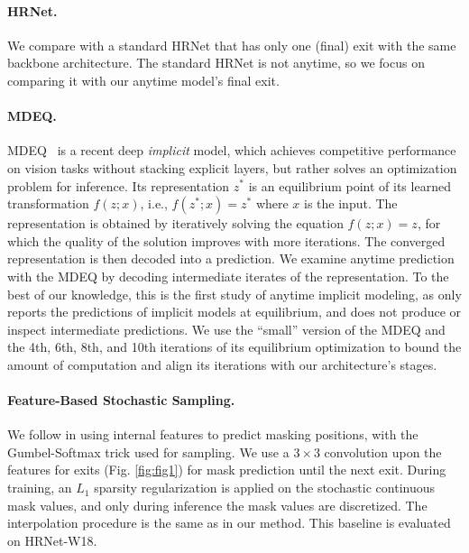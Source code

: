 \paragraph{HRNet.} We compare with a standard HRNet that has only one (final) exit with the same backbone architecture.
The standard HRNet is not anytime, so we focus on comparing it with our anytime model's final exit.

\paragraph{MDEQ.} MDEQ~\cite{bai2020multiscale} is a recent deep \emph{implicit} model, which achieves competitive performance on vision tasks without stacking explicit layers, but rather solves an optimization problem for inference. 
Its representation $z^*$ is an equilibrium point of its learned transformation $f(z; x)$, i.e., $f(z^*; x) = z^*$ where $x$ is the input.
The representation is obtained by iteratively solving the equation $f(z; x) = z$, for which the quality of the solution improves with more iterations.
The converged representation is then decoded into a prediction.
We examine anytime prediction with the MDEQ by decoding intermediate iterates of the representation. 
To the best of our knowledge, this is the first study of anytime implicit modeling, as \cite{bai2020multiscale} only reports the predictions of implicit models at equilibrium, and does not produce or inspect intermediate predictions.
We use the ``small'' version of the MDEQ \cite{bai2020multiscale} and the 4th, 6th, 8th, and 10th iterations of its equilibrium optimization to bound the amount of computation and align its iterations with our architecture's stages. 

\paragraph{Feature-Based Stochastic Sampling.} We follow \cite{xie2020spatially} in using internal features to predict masking positions, with the Gumbel-Softmax trick \cite{jang2016categorical} used for sampling. We use a $3\times3$ convolution upon the features for exits (Fig. \ref{fig:fig1}) for mask prediction until the next exit. During training, an $L_1$ sparsity regularization is applied on the stochastic continuous mask values, and only during inference the mask values are discretized. The interpolation procedure is the same as in our method. This baseline is evaluated on HRNet-W18.

